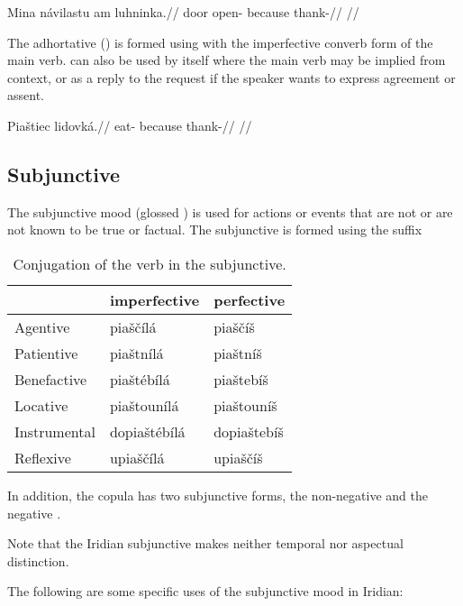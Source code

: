 \pex
\begingl
\gla Mina n\'avilastu am luhninka.//
\glb door open- because thank-//
\glft {}//
\endgl
\xe

The adhortative () is formed using  with the imperfective converb form of the main verb.  can also be used by itself where the main verb may be implied from context, or as a reply to the request if the speaker wants to express agreement or assent.

\pex
\begingl
\gla Pia\v{s}tiec lidovk\'a.//
\glb eat- because thank-//
\glft {}//
\endgl
\xe

\subsection{Subjunctive}

The subjunctive mood (glossed ) is used for actions or events that are not or are not known to be true or factual. The subjunctive is formed using the suffix 

\begin{table}
	\footnotesize\sffamily
	\caption{Conjugation of the verb  in the subjunctive.}
	\begin{tabu}to 0.7\textwidth{YYY}
		\toprule
		&{\sc imperfective} &{\sc perfective}\\
		\midrule
		Agentive	& pia\v{s}\v{c}\'il\'a	& pia\v{s}\v{c}\'i\v{s}\\
		Patientive	& pia\v{s}tn\'il\'a		& pia\v{s}tn\'i\v{s}\\
		Benefactive	& pia\v{s}t\'eb\'il\'a		& pia\v{s}teb\'i\v{s}\\
		Locative	& pia\v{s}toun\'il\'a		& pia\v{s}toun\'i\v{s}\\
		Instrumental& dopia\v{s}t\'eb\'il\'a	& dopia\v{s}teb\'i\v{s}\\
		Reflexive	& upia\v{s}\v{c}\'il\'a	& upia\v{s}\v{c}\'i\v{s}\\
		\bottomrule
	\end{tabu}
\end{table}

In addition, the copula has two subjunctive forms, the non-negative  and the negative .

Note that the Iridian subjunctive makes neither temporal nor aspectual distinction.

\par The following are some specific uses of the subjunctive mood in Iridian:

